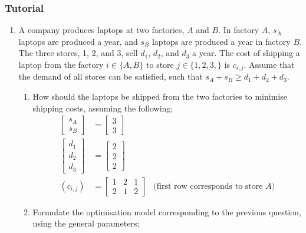 \documentclass[a4paper, 12pt]{article}
\begin{document}
            \subsubsection*{Tutorial}
                \begin{enumerate}[1.]
                    \itemsep0em
                    \setcounter{enumi}{1}
                    \item
                        A company produces laptops at two factories, $A$ and $B$.
                        In factory $A$, $s_A$ laptops are produced a year, and $s_B$ laptops are produced a year in factory $B$.
                        The three stores, 1, 2, and 3, sell $d_1$, $d_2$, and $d_3$ a year.
                        The cost of shipping a laptop from the factory $i \in \{A, B\}$ to store $j \in \{1, 2, 3,\}$ is $c_{i, j}$.
                        Assume that the demand of all stores can be satisfied, such that $s_A + s_B \geq d_1 + d_2 + d_3$.
                        \begin{enumerate}[1.]
                            \itemsep0em
                            \item How should the laptops be shipped from the two factories to minimise shipping costs, assuming the following;
                                \begin{align*}
                                    \begin{bmatrix}
                                        s_A \\ s_B
                                    \end{bmatrix} & = \begin{bmatrix}
                                        3 \\ 3
                                    \end{bmatrix} \\
                                    \begin{bmatrix}
                                        d_1 \\ d_2 \\ d_3
                                    \end{bmatrix} & = \begin{bmatrix}
                                        2 \\ 2 \\ 2
                                    \end{bmatrix} \\
                                    (c_{i, j}) & = \begin{bmatrix}
                                        1 & 2 & 1 \\
                                        2 & 1 & 2
                                    \end{bmatrix} & \text{(first row corresponds to store $A$)}
                                \end{align*}
                            \item Formulate the optimisation model corresponding to the previous question, using the general parameters;
                                \medskip


\end{enumerate}
\end{enumerate}
\end{document}
